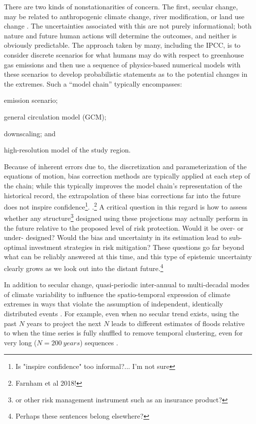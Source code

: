 \documentclass[12pt]{article}
\begin{document}
There are two kinds of nonstationarities of concern.
The first, secular change, may be related to anthropogenic climate change, river modification, or land use change \citep{Merz2014}.
The uncertainties associated with this are not purely informational; both nature and future human actions will determine the outcomes, and neither is obviously predictable.
The approach taken by many, including the IPCC, is to consider discrete scenarios for what humans may do with respect to greenhouse gas emissions and then use a sequence of physics-based numerical models with these scenarios to develop probabilistic statements as to the potential changes in the extremes.
Such a ``model chain'' typically encompasses:
\begin{enumerate*}[label= (\roman*) ]
  \item emission scenario;
  \item general circulation model (GCM);
  \item downscaling; and
  \item high-resolution model of the study region.
\end{enumerate*}
Because of inherent errors due to, \eg{} the discretization and parameterization of the equations of motion, bias correction methods are typically applied at each step of the chain; while this typically improves the model chain's representation of the historical record, the extrapolation of these bias corrections far into the future does not inspire confidence\footnote{Is "inspire confidence" too informal?... I'm not sure}. \citep{Dankers2009,Ott2013,Merz2014,Dittes2017}.\footnote{Farnham et al 2018!}
A critical question in this regard is how to assess whether any structure\footnote{or other risk management instrument such as an insurance product?} designed using these projections may actually perform in the future relative to the proposed level of risk protection.
Would it be over- or under- designed?
Would the bias and uncertainty in its estimation lead to sub-optimal investment strategies in risk mitigation?
These questions go far beyond what can be reliably answered at this time, and this type of epistemic uncertainty clearly grows as we look out into the distant future.\footnote{Perhaps these sentences belong elsewhere?}

In addition to secular change, quasi-periodic inter-annual to multi-decadal modes of climate variability \citep[see][]{Hannachi2017} to influence the spatio-temporal expression of climate extremes in ways that violate the assumption of independent, identically distributed events \citep[see][]{Merz2014,Serinaldi2015,Hoskins2015}.
For example, even when no secular trend exists, using the past $N$ years to project the next $N$ leads to different estimates of floods relative to when the time series is fully shuffled to remove temporal clustering, even for very long ($N=\SI{200}{years}$) sequences \citep{Jain2001}.
\end{document}
